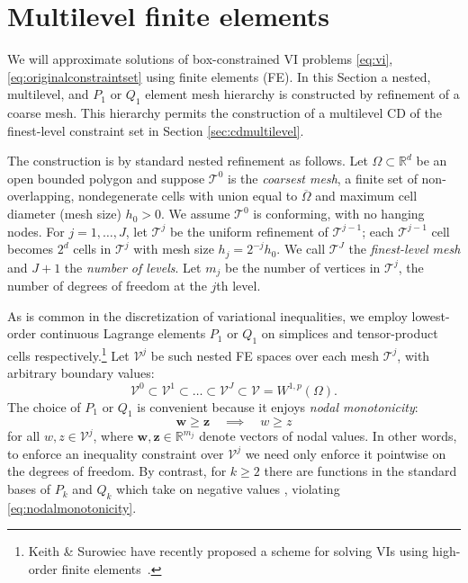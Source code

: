 \documentclass[review,hidelinks,onefignum,onetabnum,final]{siamart220329}  %
\newcommand{\RR}{\mathbb{R}}
\newcommand{\bw}{\mathbf{w}}
\newcommand{\bz}{\mathbf{z}}
\newcommand{\cV}{\mathcal{V}}
\begin{document}
\section{Multilevel finite elements} \label{sec:femultilevel}

We will approximate solutions of box-constrained VI problems \eqref{eq:vi}, \eqref{eq:originalconstraintset} using finite elements (FE).  In this Section a nested, multilevel, and $P_1$ or $Q_1$ element \cite{Elmanetal2014} mesh hierarchy is constructed by refinement of a coarse mesh.  This hierarchy permits the construction of a multilevel CD of the finest-level constraint set in Section \ref{sec:cdmultilevel}.

The construction is by standard nested refinement as follows.  Let $\Omega \subset \RR^d$ be an open bounded polygon and suppose $\mathcal{T}^0$ is the \emph{coarsest mesh}, a finite set of non-overlapping, nondegenerate cells with union equal to $\overline{\Omega}$ and maximum cell diameter (mesh size) $h_0>0$.  We assume $\mathcal{T}^0$ is conforming, with no hanging nodes.  For $j=1,\dots,J$, let $\mathcal{T}^j$ be the uniform refinement of $\mathcal{T}^{j-1}$; each $\mathcal{T}^{j-1}$ cell becomes $2^d$ cells in $\mathcal{T}^j$ with mesh size $h_j = 2^{-j} h_0$.  We call $\mathcal{T}^J$ the \emph{finest-level mesh} and $J+1$ the \emph{number of levels}.  Let $m_j$ be the number of vertices in $\mathcal{T}^j$, the number of degrees of freedom at the $j$th level.

As is common in the discretization of variational inequalities, we employ lowest-order continuous Lagrange elements $P_1$ or $Q_1$ on simplices and tensor-product cells respectively.\footnote{Keith \& Surowiec have recently proposed a scheme for solving VIs using high-order finite elements~\cite{Keith2023}.}  Let $\mathcal{V}^j$ be such nested FE spaces over each mesh $\mathcal{T}^j$, with arbitrary boundary values:
\begin{equation}
\mathcal{V}^0 \subset \mathcal{V}^1 \subset \dots \subset \mathcal{V}^J \subset \mathcal{V}=W^{1,p}(\Omega).  \label{eq:fe:nestedspaces}
\end{equation}
The choice of $P_1$ or $Q_1$ is convenient because it enjoys \emph{nodal monotonicity}:
\begin{equation}
\bw \ge \bz \quad \implies \quad w \ge z \label{eq:nodalmonotonicity}
\end{equation}
for all $w,z \in \mathcal{V}^j$, where $\bw,\bz \in \RR^{m_j}$ denote vectors of nodal values. In other words, to enforce an inequality constraint over $\cV^j$ we need only enforce it pointwise on the degrees of freedom.  By contrast, for $k\ge 2$ there are functions in the standard bases of $P_k$ and $Q_k$ which take on negative values \cite[Figure 1.7]{Elmanetal2014}, violating \eqref{eq:nodalmonotonicity}.
\end{document}
